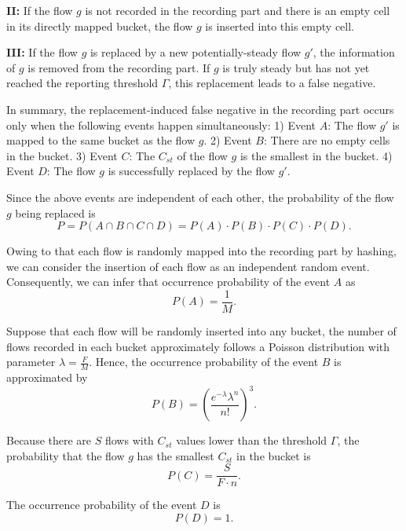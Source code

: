 \documentclass[preprint,12pt]{elsarticle}
\begin{document}
\textbf{II:} If the flow $g$ is not recorded in the recording part and there is an empty cell in its directly mapped bucket, the flow $g$ is inserted into this empty cell.

\textbf{III:} If the flow $g$ is replaced by a new potentially-steady flow $g'$, the information of $g$ is removed from the recording part. If $g$ is truly steady but has not yet reached the reporting threshold $\Gamma$, this replacement leads to a false negative.

In summary, the replacement-induced false negative in the recording part occurs only when the following events happen simultaneously: 1) Event $A$: The flow $g'$ is mapped to the same bucket as the flow $g$. 2) Event $B$: There are no empty cells in the bucket. 3) Event $C$: The $C_{st}$ of the flow $g$ is the smallest in the bucket. 4) Event $D$: The flow $g$ is successfully replaced by the flow $g'$.

Since the above events are independent of each other, the probability of the flow $g$ being replaced is
\begin{equation}
    P = P(A \cap B \cap C \cap D) = P(A) \cdot P(B) \cdot P(C) \cdot P(D).
\end{equation}

Owing to that each flow is randomly mapped into the recording part by hashing, we can consider the insertion of each flow as an independent random event. Consequently, we can infer that occurrence probability of the event $A$ as
\begin{equation}
    P(A) = \frac{1}{M}.
\end{equation}

Suppose that each flow will be randomly inserted into any bucket, the number of flows recorded in each bucket approximately follows a Poisson distribution with parameter $\lambda = \frac{F}{M}$. Hence, the occurrence probability of the event $B$ is approximated by
\begin{equation}
    P(B) = \left(\frac{e^{-\lambda} \lambda^n}{n!}\right)^3.
\end{equation}

Because there are $S$ flows with $C_{st}$ values lower than the threshold $\Gamma$, the probability that the flow $g$ has the smallest $C_{st}$ in the bucket is
\begin{equation}
    P(C) = \frac{S}{F \cdot n}.
\end{equation}

The occurrence probability of the event $D$ is
\begin{equation}
    P(D) = 1.
\end{equation}
\end{document}
